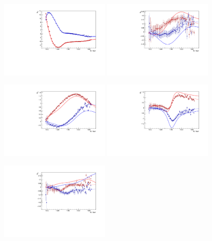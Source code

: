 \documentclass[a4paper,12pt]{report}
\begin{document}
\begin{figure}
  \begin{center}
    \centerline{
    \includegraphics[width=0.49\textwidth]{MAID/Hedim/plots.0/E0p.pdf}
    \includegraphics[width=0.49\textwidth]{MAID/Hedim/plots.0/E1p.pdf}
    }
    \centerline{
    \includegraphics[width=0.49\textwidth]{MAID/Hedim/plots.0/M1p.pdf}
    \includegraphics[width=0.49\textwidth]{MAID/Hedim/plots.0/M1m.pdf}
    }
    \centerline{
    \includegraphics[width=0.49\textwidth]{MAID/Hedim/plots.0/E2p.pdf}
}
\end{center}
\end{figure}
\end{document}
